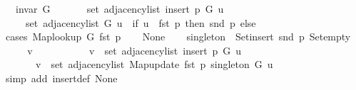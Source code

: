 \begin{isabellebody}
\ \ \ {\isachardoublequoteopen}invar\ G{\isachardoublequoteclose}\isanewline
\ \ \isanewline
\ \ \ \ {\isachardoublequoteopen}set\ {\isacharparenleft}{\kern0pt}adjacency{\isacharunderscore}{\kern0pt}list\ {\isacharparenleft}{\kern0pt}insert\ p\ G{\isacharparenright}{\kern0pt}\ u{\isacharparenright}{\kern0pt}\ {\isacharequal}{\kern0pt}\isanewline
\ \ \ \ \ set\ {\isacharparenleft}{\kern0pt}adjacency{\isacharunderscore}{\kern0pt}list\ G\ u{\isacharparenright}{\kern0pt}\ {\isasymunion}\ {\isacharparenleft}{\kern0pt}if\ u\ {\isacharequal}{\kern0pt}\ fst\ p\ then\ {\isacharbraceleft}{\kern0pt}snd\ p{\isacharbraceright}{\kern0pt}\ else\ {\isacharbraceleft}{\kern0pt}{\isacharbraceright}{\kern0pt}{\isacharparenright}{\kern0pt}{\isachardoublequoteclose}\isanewline
%
\isadelimproof
%
\endisadelimproof
%
\isatagproof
{}\isamarkupfalse%
\ {\isacharparenleft}{\kern0pt}cases\ {\isachardoublequoteopen}Map{\isacharunderscore}{\kern0pt}lookup\ G\ {\isacharparenleft}{\kern0pt}fst\ p{\isacharparenright}{\kern0pt}{\isachardoublequoteclose}{\isacharparenright}{\kern0pt}\isanewline
\ \ \isamarkupfalse%
\ None\isanewline
\ \ \isamarkupfalse%
\ {\isacharquery}{\kern0pt}singleton\ {\isacharequal}{\kern0pt}\ {\isachardoublequoteopen}Set{\isacharunderscore}{\kern0pt}insert\ {\isacharparenleft}{\kern0pt}snd\ p{\isacharparenright}{\kern0pt}\ Set{\isacharunderscore}{\kern0pt}empty{\isachardoublequoteclose}\isanewline
\ \ \isacommand{{\isacharbraceleft}{\kern0pt}}\isamarkupfalse%
\ \isamarkupfalse%
\ v\isanewline
\ \ \ \ \isamarkupfalse%
\isanewline
\ \ \ \ \ \ {\isachardoublequoteopen}v\ {\isasymin}\ set\ {\isacharparenleft}{\kern0pt}adjacency{\isacharunderscore}{\kern0pt}list\ {\isacharparenleft}{\kern0pt}insert\ p\ G{\isacharparenright}{\kern0pt}\ u{\isacharparenright}{\kern0pt}\ {\isasymlongleftrightarrow}\isanewline
\ \ \ \ \ \ \ v\ {\isasymin}\ set\ {\isacharparenleft}{\kern0pt}adjacency{\isacharunderscore}{\kern0pt}list\ {\isacharparenleft}{\kern0pt}Map{\isacharunderscore}{\kern0pt}update\ {\isacharparenleft}{\kern0pt}fst\ p{\isacharparenright}{\kern0pt}\ {\isacharquery}{\kern0pt}singleton\ G{\isacharparenright}{\kern0pt}\ u{\isacharparenright}{\kern0pt}{\isachardoublequoteclose}\isanewline
\ \ \ \ \ \ \isamarkupfalse%
\ {\isacharparenleft}{\kern0pt}simp\ add{\isacharcolon}{\kern0pt}\ insert{\isacharunderscore}{\kern0pt}def\ None{\isacharparenright}{\kern0pt}\isanewline
\ \ \ \ \isamarkupfalse%
\ \isamarkupfalse%

\end{isabellebody}
